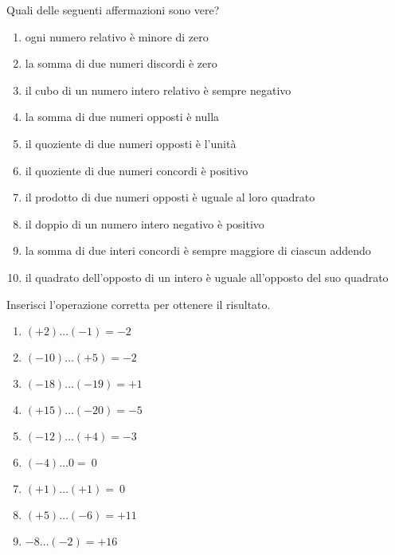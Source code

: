\pagebreak %

\begin{esercizio}
Quali delle seguenti affermazioni sono vere?
\TabPositions{12cm}
\begin{enumerate}[noitemsep, label=(\alph*)]
 \item ogni numero relativo è minore di zero \tab\verofalso
 \item la somma di due numeri discordi è zero \tab\verofalso
 \item il cubo di un numero intero relativo è sempre negativo 
\tab\verofalso
 \item la somma di due numeri opposti è nulla \tab\verofalso
 \item il quoziente di due numeri opposti è l'unità \tab\verofalso
 \item il quoziente di due numeri concordi è positivo \tab\verofalso
 \item il prodotto di due numeri opposti è uguale al loro quadrato 
\tab\verofalso
 \item il doppio di un numero intero negativo è positivo \tab\verofalso
 \item la somma di due interi concordi è sempre maggiore di ciascun addendo 
\tab\verofalso
 \item il quadrato dell'opposto di un intero è uguale all'opposto del suo 
quadrato \tab\verofalso
\end{enumerate}
\end{esercizio}

\begin{esercizio}
Inserisci l'operazione corretta per ottenere il risultato.

\vspace{-.5em}
 \begin{multicols}{3}
 \begin{enumerate}[noitemsep, label=(\alph*)]
 \item \((+2)\ldots(-1) = -2\)
 \item \((-10)\ldots(+5) = -2\)
 \item \((-18)\ldots(-19) = +1\)
 \item \((+15)\ldots(-20) = -5\)
 \item \((-12)\ldots(+4) = -3\)
 \item \((-4)\ldots0 =~0\)
 \item \((+1)\ldots(+1) =~0\)
 \item \((+5)\ldots(-6) = +11\)
 \item \(-8\ldots(-2) = +16\)
 \end{enumerate}
 \end{multicols}
\end{esercizio}


